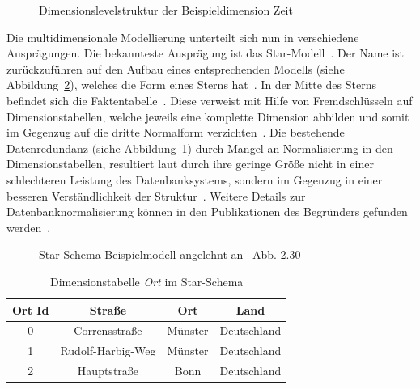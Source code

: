 \documentclass[
  language=german, %
  type=bachelor,%
  ngerman
]{isthesis}
\begin{document}
\begin{content}
  \begin{figure}
    \resizebox{100pt}{!}{}
    \caption{Dimensionslevelstruktur der Beispieldimension Zeit}\label{hierarchie-level-struktur}
  \end{figure}

	Die multidimensionale Modellierung unterteilt sich nun in verschiedene
	Ausprägungen.  Die bekannteste Ausprägung ist das Star-Modell~\cite[][S.
	2]{phipps2002automating}. Der Name ist zurückzuführen auf den Aufbau eines
	entsprechenden Modells (siehe Abbildung~\ref{fig:star-schema}), welches die
	Form eines Sterns hat~\cite[][S.  44]{Kimball2013}. In der Mitte des Sterns
	befindet sich die Faktentabelle~\cite[][S. 67]{Kemper2010}. Diese verweist
	mit Hilfe von Fremdschlüsseln auf Dimensionstabellen, welche jeweils eine
	komplette Dimension abbilden und somit im Gegenzug auf die dritte Normalform
	verzichten~\cite[][S. 67 f.]{Kemper2010}. Die bestehende Datenredundanz
	(siehe Abbildung~\ref{table:dimension-table}) durch Mangel an Normalisierung
	in den Dimensionstabellen, resultiert laut \textsc{\citeauthor{Kimball2013}}
	durch ihre geringe Größe nicht in einer schlechteren Leistung des
	Datenbanksystems, sondern im Gegenzug in einer besseren Verständlichkeit der
	Struktur~\cite[][S. 15]{Kimball2013}. Weitere Details zur
	Datenbanknormalisierung können in den Publikationen des
	Begründers 
	\textsc{\citeauthor{codd1970relational}} gefunden
	werden~\citeyearpar{codd1970relational,codd1972further}.

  \begin{figure}
    \resizebox{0.5\linewidth}{!}{}
    \caption[Star-Schema Beispielmodell]{Star-Schema Beispielmodell angelehnt an~\cite{Kemper2010} Abb. 2.30}\label{fig:star-schema}
  \end{figure}

  \begin{table}[]
    \footnotesize
    \begin{tabular}{c c c c}
      Ort Id & Straße & Ort & Land \\
      \toprule
      0 & Corrensstraße & Münster & Deutschland \\
      1 & Rudolf-Harbig-Weg & Münster & Deutschland \\
      2 & Hauptstraße & Bonn & Deutschland \\
    \end{tabular}
    \caption{Dimensionstabelle \textit{Ort} im Star-Schema}\label{table:dimension-table}
  \end{table}


\end{content}
\end{document}
